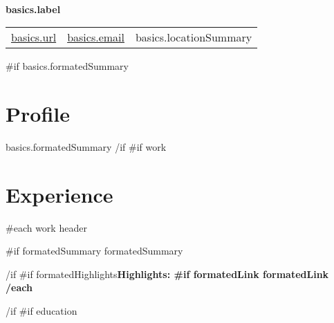 \documentclass{article}
\begin{document}
\begin{paracol}{2}
\begin{rightcolumn}
\titleformat{\section}{\color{accent}\raggedright\normalsize\bfseries\uppercase}{}{0ex}{}[{\titlerule[0.8pt]}]
\titlespacing{\section}{0ex}{0.5ex}{0.75ex}
\begin{center}
  \textbf {
    \Huge
  }\\\smallskip
  \textbf {
    \color{primary-950}\large {{ basics.label }}
  }\\\smallskip

  \begin{supertabular}{l l l}
    \href { {{ basics.url }} }{ {{ basics.url }} } &
    \href { mailto:{{ basics.email }} }{ {{ basics.email }} } &
     {{ basics.locationSummary }} \\
  \end{supertabular}
\end{center}
{{#if basics.formatedSummary}}
\section*{Profile} {
  {{ basics.formatedSummary }}
}
{{/if}}
{{#if work}}
\section*{Experience} {
  {{#each work}}
    {{ header }}\par
    {{#if formatedSummary}}
      {{ formatedSummary }}
      \par
    {{/if}}
    {{#if formatedHighlights}}\bfseries Highlights: 
    {{#if formatedLink}}{{ formatedLink }}
  {{/each}}
}
{{/if}}
{{#if education}}

\end{rightcolumn}
\end{paracol}
\end{document}
